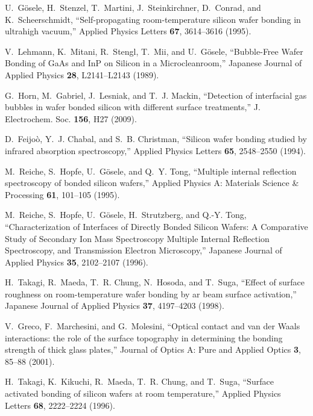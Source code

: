 \documentclass[osajnl,twocolumn,showpacs,superscriptaddress,11pt]{revtex4-1} %
\begin{document}
\begin{thebibliography}{10}
U.~{G{\"o}sele}, H.~{Stenzel}, T.~{Martini}, J.~{Steinkirchner}, D.~{Conrad},
  and K.~{Scheerschmidt}, \enquote{{Self-propagating room-temperature silicon
  wafer bonding in ultrahigh vacuum},} Applied Physics Letters \textbf{67},
  3614--3616 (1995).

V.~{Lehmann}, K.~{Mitani}, R.~{Stengl}, T.~{Mii}, and U.~{G{\"o}sele},
  \enquote{{Bubble-Free Wafer Bonding of GaAs and InP on Silicon in a
  Microcleanroom},} Japanese Journal of Applied Physics \textbf{28},
  L2141--L2143 (1989).

G.~Horn, M.~Gabriel, J.~Lesniak, and T.~J. Mackin, \enquote{Detection of
  interfacial gas bubbles in wafer bonded silicon with different surface
  treatments,} J. Electrochem. Soc. \textbf{156}, H27 (2009).

D.~Feijo\`o, Y.~J. Chabal, and S.~B. Christman, \enquote{Silicon wafer bonding
  studied by infrared absorption spectroscopy,} Applied Physics Letters
  \textbf{65}, 2548--2550 (1994).

M.~{Reiche}, S.~{Hopfe}, U.~{G{\"o}sele}, and Q.~Y. {Tong}, \enquote{{Multiple
  internal reflection spectroscopy of bonded silicon wafers},} Applied Physics
  A: Materials Science \& Processing \textbf{61}, 101--105 (1995).

M.~{Reiche}, S.~{Hopfe}, U.~{G{\"o}sele}, H.~{Strutzberg}, and Q.-Y. {Tong},
  \enquote{{Characterization of Interfaces of Directly Bonded Silicon Wafers: A
  Comparative Study of Secondary Ion Mass Spectroscopy Multiple Internal
  Reflection Spectroscopy, and Transmission Electron Microscopy},} Japanese
  Journal of Applied Physics \textbf{35}, 2102--2107 (1996).

H.~Takagi, R.~Maeda, T.~R. Chung, N.~Hosoda, and T.~Suga, \enquote{Effect of
  surface roughness on room-temperature wafer bonding by ar beam surface
  activation,} Japanese Journal of Applied Physics \textbf{37}, 4197--4203
  (1998).

V.~{Greco}, F.~{Marchesini}, and G.~{Molesini}, \enquote{{Optical contact and
  van der Waals interactions: the role of the surface topography in determining
  the bonding strength of thick glass plates},} Journal of Optics A: Pure and
  Applied Optics \textbf{3}, 85--88 (2001).

H.~{Takagi}, K.~{Kikuchi}, R.~{Maeda}, T.~R. {Chung}, and T.~{Suga},
  \enquote{{Surface activated bonding of silicon wafers at room temperature},}
  Applied Physics Letters \textbf{68}, 2222--2224 (1996).


\end{thebibliography}
\end{document}
